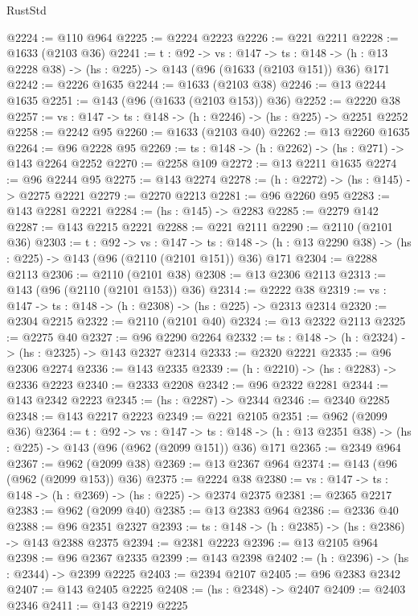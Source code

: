 \begin{lexlean}{RustStd}
\begin{coremodule}
@2224 := @110 @964
@2225 := @2224 @2223
@2226 := @221 @2211
@2228 := @1633 (@2103 @36)
@2241 := {t : @92} ->
  {vs : @147} ->
  {ts : @148} -> (h : @13 @2228 @38) -> (hs : @225) -> @143 (@96 (@1633 (@2103 @151)) @36) @171
@2242 := @2226 @1635
@2244 := @1633 (@2103 @38)
@2246 := @13 @2244 @1635
@2251 := @143 (@96 (@1633 (@2103 @153)) @36)
@2252 := @2220 @38
@2257 := {vs : @147} -> {ts : @148} -> (h : @2246) -> (hs : @225) -> @2251 @2252
@2258 := @2242 @95
@2260 := @1633 (@2103 @40)
@2262 := @13 @2260 @1635
@2264 := @96 @2228 @95
@2269 := {ts : @148} -> (h : @2262) -> (hs : @271) -> @143 @2264 @2252
@2270 := @2258 @109
@2272 := @13 @2211 @1635
@2274 := @96 @2244 @95
@2275 := @143 @2274
@2278 := (h : @2272) -> (hs : @145) -> @2275 @2221
@2279 := @2270 @2213
@2281 := @96 @2260 @95
@2283 := @143 @2281 @2221
@2284 := (hs : @145) -> @2283
@2285 := @2279 @142
@2287 := @143 @2215 @2221
@2288 := @221 @2111
@2290 := @2110 (@2101 @36)
@2303 := {t : @92} ->
  {vs : @147} ->
  {ts : @148} -> (h : @13 @2290 @38) -> (hs : @225) -> @143 (@96 (@2110 (@2101 @151)) @36) @171
@2304 := @2288 @2113
@2306 := @2110 (@2101 @38)
@2308 := @13 @2306 @2113
@2313 := @143 (@96 (@2110 (@2101 @153)) @36)
@2314 := @2222 @38
@2319 := {vs : @147} -> {ts : @148} -> (h : @2308) -> (hs : @225) -> @2313 @2314
@2320 := @2304 @2215
@2322 := @2110 (@2101 @40)
@2324 := @13 @2322 @2113
@2325 := @2275 @40
@2327 := @96 @2290 @2264
@2332 := {ts : @148} -> (h : @2324) -> (hs : @2325) -> @143 @2327 @2314
@2333 := @2320 @2221
@2335 := @96 @2306 @2274
@2336 := @143 @2335
@2339 := (h : @2210) -> (hs : @2283) -> @2336 @2223
@2340 := @2333 @2208
@2342 := @96 @2322 @2281
@2344 := @143 @2342 @2223
@2345 := (hs : @2287) -> @2344
@2346 := @2340 @2285
@2348 := @143 @2217 @2223
@2349 := @221 @2105
@2351 := @962 (@2099 @36)
@2364 := {t : @92} ->
  {vs : @147} ->
  {ts : @148} -> (h : @13 @2351 @38) -> (hs : @225) -> @143 (@96 (@962 (@2099 @151)) @36) @171
@2365 := @2349 @964
@2367 := @962 (@2099 @38)
@2369 := @13 @2367 @964
@2374 := @143 (@96 (@962 (@2099 @153)) @36)
@2375 := @2224 @38
@2380 := {vs : @147} -> {ts : @148} -> (h : @2369) -> (hs : @225) -> @2374 @2375
@2381 := @2365 @2217
@2383 := @962 (@2099 @40)
@2385 := @13 @2383 @964
@2386 := @2336 @40
@2388 := @96 @2351 @2327
@2393 := {ts : @148} -> (h : @2385) -> (hs : @2386) -> @143 @2388 @2375
@2394 := @2381 @2223
@2396 := @13 @2105 @964
@2398 := @96 @2367 @2335
@2399 := @143 @2398
@2402 := (h : @2396) -> (hs : @2344) -> @2399 @2225
@2403 := @2394 @2107
@2405 := @96 @2383 @2342
@2407 := @143 @2405 @2225
@2408 := (hs : @2348) -> @2407
@2409 := @2403 @2346
@2411 := @143 @2219 @2225

\end{coremodule}
\end{lexlean}
